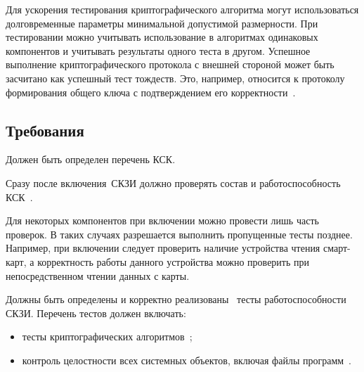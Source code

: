 Для ускорения тестирования криптографического алгоритма
могут использоваться долговременные параметры минимальной допустимой 
размерности. При тестировании можно учитывать 
использование в алгоритмах одинаковых компонентов и учитывать результаты
одного теста в другом. Успешное выполнение 
криптографического протокола с внешней стороной может быть засчитано
как успешный тест тождеств. Это, например, относится к протоколу 
формирования общего ключа с подтверждением его корректности~.


\subsection{Требования}\label{ST.Reqs}

\label{R.ST.CSCList} %
Должен быть определен перечень КСК.


\label{R.ST.CSCTests} %
Сразу после включения~СКЗИ должно проверять состав 
и работоспособность КСК~.

\begin{note}
Для некоторых компонентов при включении можно провести лишь часть 
проверок. В таких случаях разрешается выполнить пропущенные тесты позднее. 
Например, при включении следует проверить наличие устройства чтения 
смарт-карт, а корректность работы данного устройства можно проверить при 
непосредственном чтении данных с карты. 
\end{note}

\label{R.ST.Tests} %
Должны быть определены и корректно 
реализованы~
тесты работоспособности СКЗИ.
Перечень тестов должен включать:
\begin{itemize}
\item
тесты криптографических алгоритмов~;
\item
контроль целостности всех системных объектов, включая файлы 
программ~.
\end{itemize}

